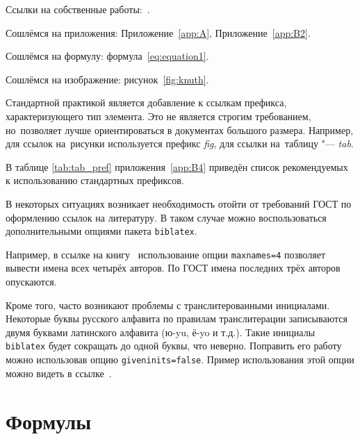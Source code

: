 %

Ссылки на собственные работы:~\cite{vakbib1, confbib1}.

Сошлёмся на приложения: Приложение~\cref{app:A}, Приложение~\cref{app:B2}.

Сошлёмся на формулу: формула~\cref{eq:equation1}.

Сошлёмся на изображение: рисунок~\cref{fig:knuth}.

Стандартной практикой является добавление к ссылкам префикса, характеризующего тип элемента.
Это не является строгим требованием, но~позволяет лучше ориентироваться в документах большого размера.
Например, для ссылок на~рисунки используется префикс \textit{fig},
для ссылки на~таблицу "--- \textit{tab}.

В таблице \cref{tab:tab_pref} приложения~\cref{app:B4} приведён список рекомендуемых
к использованию стандартных префиксов.

В некоторых ситуациях возникает необходимость отойти от требований ГОСТ по оформлению ссылок на
литературу.
В таком случае можно воспользоваться дополнительными опциями пакета \verb+biblatex+.

Например, в ссылке на книгу~\cite{sobenin_kdv} использование опции \verb+maxnames=4+ позволяет
вывести имена всех четырёх авторов.
По ГОСТ имена последних трёх авторов опускаются.

Кроме того, часто возникают проблемы с транслитерованными инициалами. Некоторые буквы русского
алфавита по правилам транслитерации записываются двумя буквами латинского алфавита (ю-yu, ё-yo и
т.д.).
Такие инициалы \verb+biblatex+ будет сокращать до одной буквы, что неверно.
Поправить его работу можно использовав опцию \verb+giveninits=false+.
Пример использования этой опции можно видеть в ссылке~\cite{initials}.

\section{Формулы}\label{sec:ch1/sec3}

